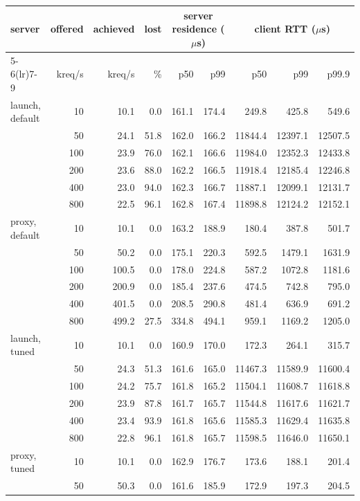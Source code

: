 \begin{tabular}{lrrrrrrrr}\toprule
server & offered & achieved & lost & \multicolumn{2}{c}{server residence ($\mu$s)} & \multicolumn{3}{c}{client RTT ($\mu$s)} \\
\cmidrule(lr){5-6}\cmidrule(lr){7-9}
 & kreq/s & kreq/s & \% & p50 & p99 & p50 & p99 & p99.9 \\ \midrule
launch, default & 10 & 10.1 & 0.0 & 161.1 & 174.4 & 249.8 & 425.8 & 549.6 \\
 & 50 & 24.1 & 51.8 & 162.0 & 166.2 & 11844.4 & 12397.1 & 12507.5 \\
 & 100 & 23.9 & 76.0 & 162.1 & 166.6 & 11984.0 & 12352.3 & 12433.8 \\
 & 200 & 23.6 & 88.0 & 162.2 & 166.5 & 11918.4 & 12185.4 & 12246.8 \\
 & 400 & 23.0 & 94.0 & 162.3 & 166.7 & 11887.1 & 12099.1 & 12131.7 \\
 & 800 & 22.5 & 96.1 & 162.8 & 167.4 & 11898.8 & 12124.2 & 12152.1 \\
\addlinespace
proxy, default & 10 & 10.1 & 0.0 & 163.2 & 188.9 & 180.4 & 387.8 & 501.7 \\
 & 50 & 50.2 & 0.0 & 175.1 & 220.3 & 592.5 & 1479.1 & 1631.9 \\
 & 100 & 100.5 & 0.0 & 178.0 & 224.8 & 587.2 & 1072.8 & 1181.6 \\
 & 200 & 200.9 & 0.0 & 185.4 & 237.6 & 474.5 & 742.8 & 795.0 \\
 & 400 & 401.5 & 0.0 & 208.5 & 290.8 & 481.4 & 636.9 & 691.2 \\
 & 800 & 499.2 & 27.5 & 334.8 & 494.1 & 959.1 & 1169.2 & 1205.0 \\
\addlinespace
launch, tuned & 10 & 10.1 & 0.0 & 160.9 & 170.0 & 172.3 & 264.1 & 315.7 \\
 & 50 & 24.3 & 51.3 & 161.6 & 165.0 & 11467.3 & 11589.9 & 11600.4 \\
 & 100 & 24.2 & 75.7 & 161.8 & 165.2 & 11504.1 & 11608.7 & 11618.8 \\
 & 200 & 23.9 & 87.8 & 161.7 & 165.7 & 11544.8 & 11617.6 & 11621.7 \\
 & 400 & 23.4 & 93.9 & 161.8 & 165.6 & 11585.3 & 11629.4 & 11635.8 \\
 & 800 & 22.8 & 96.1 & 161.8 & 165.7 & 11598.5 & 11646.0 & 11650.1 \\
\addlinespace
proxy, tuned & 10 & 10.1 & 0.0 & 162.9 & 176.7 & 173.6 & 188.1 & 201.4 \\
 & 50 & 50.3 & 0.0 & 161.6 & 185.9 & 172.9 & 197.3 & 204.5 \\

\end{tabular}
